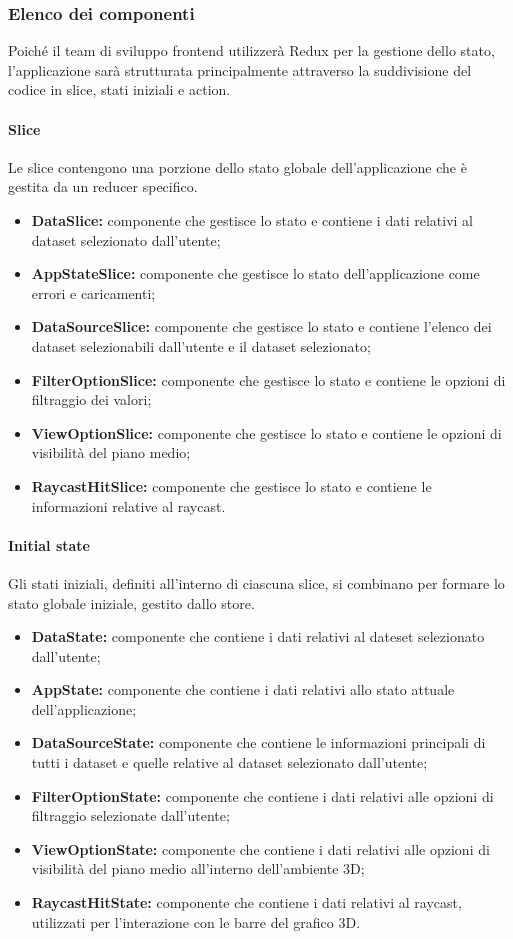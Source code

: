 \subsubsection{Elenco dei componenti}
Poiché il team di sviluppo frontend utilizzerà Redux per la gestione dello stato, l'applicazione sarà strutturata principalmente attraverso la suddivisione del codice in slice, stati iniziali e action.
\paragraph{Slice}
    Le slice contengono una porzione dello stato globale dell’applicazione che è gestita da un reducer
    specifico.
\begin{itemize}
        \item \textbf{DataSlice:} componente che gestisce lo stato e contiene i dati relativi al dataset selezionato dall'utente;
        \item \textbf{AppStateSlice:} componente che gestisce lo stato dell'applicazione come errori e caricamenti;
        \item \textbf{DataSourceSlice:} componente che gestisce lo stato e contiene l'elenco dei dataset selezionabili dall'utente e il dataset selezionato;
        \item \textbf{FilterOptionSlice:} componente che gestisce lo stato e contiene le opzioni di filtraggio dei valori;
        \item \textbf{ViewOptionSlice:} componente che gestisce lo stato e contiene le opzioni di visibilità del piano medio;
        \item \textbf{RaycastHitSlice:} componente che gestisce lo stato e contiene le informazioni relative al raycast.
\end{itemize}
\paragraph{Initial state}
    Gli stati iniziali, definiti all'interno di ciascuna slice, si combinano per formare lo stato globale iniziale, gestito dallo store.
    \begin{itemize}
        \item \textbf{DataState:} componente che contiene i dati relativi al dateset selezionato dall'utente;
        \item \textbf{AppState:} componente che contiene i dati relativi allo stato attuale dell'applicazione;
        \item \textbf{DataSourceState:} componente che contiene le informazioni principali di tutti i dataset e quelle relative al dataset selezionato dall'utente;
        \item \textbf{FilterOptionState:} componente che contiene i dati relativi alle opzioni di filtraggio selezionate dall'utente;
        \item \textbf{ViewOptionState:} componente che contiene i dati relativi alle opzioni di visibilità del piano medio all'interno dell'ambiente 3D;
        \item \textbf{RaycastHitState:} componente che contiene i dati relativi al raycast, utilizzati per l'interazione con le barre del grafico 3D.
    \end{itemize}
